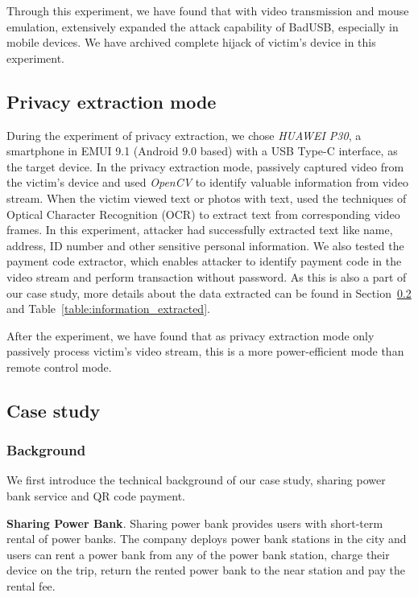 Through this experiment, we have found that with video transmission and mouse
emulation, \tool extensively expanded the attack capability of BadUSB,
especially in mobile devices. We have archived complete hijack of victim's
device in this experiment.

\subsection{Privacy extraction mode}

During the experiment of privacy extraction, we chose \textit{HUAWEI P30}, a
smartphone in EMUI 9.1 (Android 9.0 based) with a USB Type-C interface, as the
target device.  In the privacy extraction mode, \tool passively captured video
from the victim's device and used \textit{OpenCV} to identify valuable
information from video stream.  When the victim viewed text or photos with
text, \tool used the techniques of Optical Character Recognition (OCR) to
extract text from corresponding video frames.  In this experiment, attacker had
successfully extracted text like name, address, ID number and other sensitive
personal information. We also tested the payment code extractor, which enables
attacker to identify payment code in the video stream and perform transaction
without password. As this is also a part of our case study, more details about
the data extracted can be found in Section~\ref{subsec:case_study} and
Table~\ref{table:information_extracted}.

 After the
experiment, we have found that as privacy extraction mode only passively
process victim's video stream, this is a more power-efficient mode than remote
control mode.

\subsection{Case study}
\label{subsec:case_study}
\subsubsection{Background}

We first introduce the technical background of our case study, sharing power
bank service and QR code payment.

\textbf{Sharing Power Bank}.  Sharing power bank provides users with short-term
rental of power banks.  The company deploys power bank stations in the city and
users can rent a power bank from any of the power bank station, charge their
device on the trip, return the rented power bank to the near station and pay
the rental fee.

